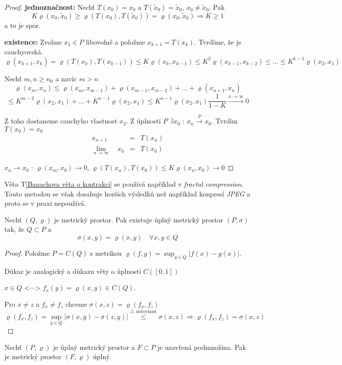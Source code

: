 \begin{proof}
\textbf{jednoznačnost: } Nechť $T(x_0) = x_0$ a $T(\tilde{x}_0) = \tilde{x}_0$, $x_0 \neq \tilde{x}_0$. Pak 
$$K \varrho (x_0, \tilde{x}_0) \geq \varrho (T(x_0),T(\tilde{x}_0)) = \varrho (x_0, \tilde{x}_0) \Rightarrow K \geq 1$$
a to je spor.

\textbf{existence: } Zvolme $x_1 \in P$ libovolně a položme $x_{k+1} = T(x_k)$. Tvrdíme, že je cauchyovská.
$$\varrho( x_{k+1}, x_k ) = \varrho (T(x_k), T(x_{k-1})) \leq K \varrho (x_k,x_{k-1}) \leq K^2 \varrho (x_{k-1},x_{k-2}) \leq \ldots \leq K^{k-1} \varrho (x_2, x_1)$$

Nechť $m,n \geq n_0$ a navíc $m > n$
$$\varrho (x_m, x_n) \leq \varrho (x_m, x_{m-1}) + \varrho (x_{m-1}, x_{m-2}) + \ldots + \varrho (x_{n+1}, x_n) $$
$$\leq K^{m-2} \varrho (x_2, x_1) + \ldots + K^{n-1} \varrho (x_2, x_1) \leq K^{n-1} \varrho (x_2, x_1) \frac{1}{1-K} \overset{x \to \infty}{\to} 0$$

Z toho dostaneme cauchyho vlastnost $x_2$. Z úplnosti $P$ $\exists x_0 \textrm{ : } x_n \overset{P}{\to} x_0$. Tvrdím $T(x_0)=x_0$
\begin{eqnarray*}
x_{n+1} & = & T(x_n) \\
\lim_{n \to \infty} \quad x_0 & = & T(x_0)
\end{eqnarray*}

$x_n \to x_0 \textrm{ : } \varrho (x_m, x_0) \to 0$, $\varrho (T(x_n), T(x_0)) \leq K \varrho (x_n, x_0) \to 0$
\end{proof}

\begin{poznamka}
Věta T\ref{Banachova věta o kontrakci} se používá například v \emph{fractal compression}. Touto metodou se však dosahuje horších výsledků než například konpresí \emph{JPEG} a proto se v praxi nepoužívá.
\end{poznamka}



\begin{vetat}
Nechť $(Q, \varrho)$ je metrický prostor. Pak existuje úplný metrický prostor $(P, \sigma)$ tak, že $Q \subset P$ a 
$$\sigma(x,y) = \varrho(x,y) \quad \forall x,y \in Q$$
\end{vetat}

\begin{proof}
Položme $P = C(Q)$ s metrikou $\varrho (f,g) = \sup_{y \in Q} | f(x)-g(x) |$. 

\begin{poznamka} 
Důkaz je analogický a důkazu věty o úplnosti $C([0,1])$
\end{poznamka}

$x \in Q \textrm{ <$\cdots$> } f_x(y) = \varrho(x,y) \in C(Q)$. 

Pro $x \neq z$ a $f_x \neq f_z$ chceme $\sigma (x,z) = \varrho (f_x, f_z)$
$$\varrho (f_x, f_z) = \sup_{y \in Q} | \sigma (x,y) - \sigma (z,y) | \overset{\textrm{$\triangle$ nerovnost}}{\leq} \sigma (x,z) \Rightarrow \varrho (f_x, f_z) = \sigma(x,z)$$ 
\end{proof}


\begin{vetal}
Nechť $(P, \varrho)$ je úplný metrický prostor a $F \subset P$ je uzavřená podmnožina. Pak je metrický prostor $(F, \varrho)$ úplný.
\end{vetal}